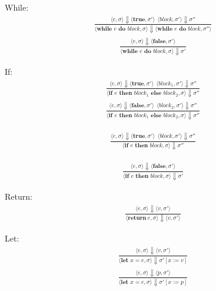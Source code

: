 \documentclass[12pt]{article}
\begin{document}
	
	While:
	\begin{align*}
		\frac{\langle e, \sigma \rangle\Downarrow \langle \textbf{true}, \sigma' \rangle \ \
		\langle block, \sigma' \rangle\Downarrow \sigma''}
		{\langle \textbf{while } e \textbf{ do } block, \sigma \rangle\Downarrow \langle \textbf{while } e \textbf{ do } block, \sigma'' \rangle}
	\end{align*}
	\begin{align*}
		\frac{\langle e, \sigma \rangle\Downarrow \langle \textbf{false}, \sigma' \rangle}
		{\langle \textbf{while } e \textbf{ do } block, \sigma \rangle\Downarrow \sigma'}
	\end{align*}

	If:
	\begin{align*}
		\frac{\langle e, \sigma \rangle\Downarrow \langle \textbf{true}, \sigma' \rangle \ \
		\langle block_1, \sigma' \rangle\Downarrow \sigma''}
		{\langle \textbf{if } e \textbf{ then } block_1 \textbf{ else } block_2, \sigma \rangle\Downarrow \sigma''}
	\end{align*}
	\begin{align*}
		\frac{\langle e, \sigma \rangle\Downarrow \langle \textbf{false}, \sigma' \rangle \ \
		\langle block_2, \sigma' \rangle\Downarrow \sigma''}
		{\langle \textbf{if } e \textbf{ then } block_1 \textbf{ else } block_2, \sigma \rangle\Downarrow \sigma''}
	\end{align*}
	
	\begin{align*}
		\frac{\langle e, \sigma \rangle\Downarrow \langle \textbf{true}, \sigma' \rangle \ \ 
		\langle block, \sigma' \rangle\Downarrow \sigma''}
		{\langle \textbf{if } e \textbf{ then } block, \sigma \rangle\Downarrow \sigma''}
	\end{align*}

	\begin{align*}
		\frac{\langle e, \sigma \rangle\Downarrow \langle \textbf{false}, \sigma' \rangle}
		{\langle \textbf{if } e \textbf{ then } block, \sigma \rangle\Downarrow \sigma'}
	\end{align*}


	Return:
	\begin{align*}
		\frac{\langle e, \sigma \rangle\Downarrow \langle v, \sigma' \rangle}
		{\langle \textbf{return}\ e, \sigma \rangle\Downarrow \langle v, \sigma' \rangle}
	\end{align*}

	Let:
	\begin{align*}
		\frac{\langle e, \sigma \rangle\Downarrow \langle v, \sigma' \rangle}
		{\langle \textbf{let } x = e, \sigma \rangle\Downarrow \sigma' [x := v]}
	\end{align*}
	\begin{align*}
		\frac{\langle e, \sigma \rangle\Downarrow \langle p, \sigma' \rangle}
		{\langle \textbf{let } x = e, \sigma \rangle\Downarrow \sigma' [x := p]}
	\end{align*}
\end{document}
